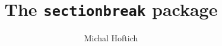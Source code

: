 \documentclass[a4page]{ltxdoc}
\begin{document}
\title{The \texttt{sectionbreak} package}
\author{Michal Hoftich}
\maketitle
{}





\end{document}
